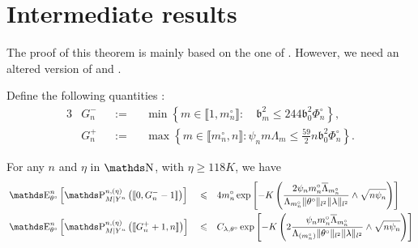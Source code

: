 \section{Intermediate results}

The proof of this theorem is mainly based on the one of .
However, we need an altered version of  and .
\begin{de}\label{DEC.4.1}
Define the following quantities :
\begin{alignat*}{3}
& G_{n}^{-} &&:=&& \min\left\{m \in \llbracket 1, m_{n}^{\circ} \rrbracket : \quad \mathfrak{b}_{m}^{2} \leq 244 \mathfrak{b}_{0}^{2} \Phi^{\circ}_{n}\right\},\\
& G_{n}^{+} &&:=&& \max \left\{m \in \llbracket m_{n}^{\circ}, n \rrbracket : \psi_{n} m \Lambda_{m} \leq \frac{59}{2} n \mathfrak{b}_{0}^{2} \Phi_{n}^{\circ} \right\}.
\end{alignat*}
\end{de}

\begin{pr}\label{PRD.4.1}
For any $n$ and $\eta$ in $\N$, with $\eta \geq 118 K$, we have
\begin{alignat}{3}
& \E_{\theta^{\circ}}^{n}\left[\P_{M \vert Y^{n}}^{n, (\eta)}\left(\llbracket 0, G^{-}_{n} - 1 \rrbracket\right)\right] && \leq && 4 m^{\circ}_{n} \exp\left[- K \left(\frac{2 \psi_{n} m^{\circ}_{n} \overline{\Lambda}_{m^{\circ}_{n}}}{\Lambda_{m^{\circ}_{n}} \Vert \theta^{\circ} \Vert_{l^{2}} \Vert \lambda \Vert_{l^{2}}} \wedge \sqrt{n \psi_{n}}\right)\right]\label{EQD.20}\\
& \E_{\theta^{\circ}}^{n}\left[\P_{M \vert Y^{n}}^{n, (\eta)}\left(\llbracket G^{+}_{n} + 1, n \rrbracket\right)\right] && \leq && C_{\lambda, \theta^{\circ}} \exp\left[- K \left(2 \frac{\psi_{n} m^{\circ}_{n} \overline{\Lambda}_{m^{\circ}_{n}}}{\Lambda_{(m^{\circ}_{n})}\Vert \theta^{\circ} \Vert_{l^{2}} \Vert \lambda \Vert_{l^{2}}} \wedge \sqrt{n \psi_{n}}\right)\right]\label{EQD.21}
\end{alignat}
\end{pr}

